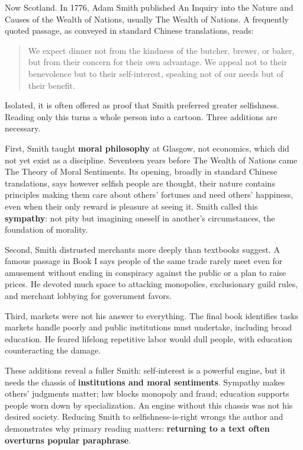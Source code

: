 Now Scotland. In 1776, Adam Smith published An Inquiry into the Nature and Causes of the Wealth of Nations, usually The Wealth of Nations. A frequently quoted passage, as conveyed in standard Chinese translations, reads:

\begin{quote}
We expect dinner not from the kindness of the butcher, brewer, or baker, but from their concern for their own advantage. We appeal not to their benevolence but to their self-interest, speaking not of our needs but of their benefit.
\end{quote}
Isolated, it is often offered as proof that Smith preferred greater selfishness. Reading only this turns a whole person into a cartoon. Three additions are necessary.

First, Smith taught \textbf{moral philosophy} at Glasgow, not economics, which did not yet exist as a discipline. Seventeen years before The Wealth of Nations came The Theory of Moral Sentiments. Its opening, broadly in standard Chinese translations, says however selfish people are thought, their nature contains principles making them care about others' fortunes and need others' happiness, even when their only reward is pleasure at seeing it. Smith called this \textbf{sympathy}: not pity but imagining oneself in another's circumstances, the foundation of morality.

Second, Smith distrusted merchants more deeply than textbooks suggest. A famous passage in Book I says people of the same trade rarely meet even for amusement without ending in conspiracy against the public or a plan to raise prices. He devoted much space to attacking monopolies, exclusionary guild rules, and merchant lobbying for government favors.

Third, markets were not his answer to everything. The final book identifies tasks markets handle poorly and public institutions must undertake, including broad education. He feared lifelong repetitive labor would dull people, with education counteracting the damage.

These additions reveal a fuller Smith: self-interest is a powerful engine, but it needs the chassis of \textbf{institutions and moral sentiments}. Sympathy makes others' judgments matter; law blocks monopoly and fraud; education supports people worn down by specialization. An engine without this chassis was not his desired society. Reducing Smith to selfishness-is-right wrongs the author and demonstrates why primary reading matters: \textbf{returning to a text often overturns popular paraphrase}.

